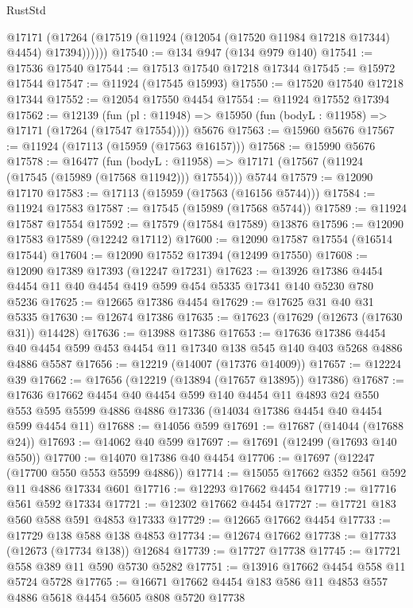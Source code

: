 \begin{lexlean}{RustStd}
\begin{coremodule}
        @17171 (@17264 (@17519 (@11924 (@12054 (@17520 @11984 @17218 @17344) @4454) @17394))))))
@17540 := @134 @947 (@134 @979 @140)
@17541 := @17536 @17540
@17544 := @17513 @17540 @17218 @17344
@17545 := @15972 @17544
@17547 := @11924 (@17545 @15993)
@17550 := @17520 @17540 @17218 @17344
@17552 := @12054 @17550 @4454
@17554 := @11924 @17552 @17394
@17562 := @12139
    (fun (pl : @11948) => @15950 (fun (bodyL : @11958) => @17171 (@17264 (@17547 @17554))))
    @5676
@17563 := @15960 @5676
@17567 := @11924 (@17113 (@15959 (@17563 @16157)))
@17568 := @15990 @5676
@17578 := @16477
    (fun (bodyL : @11958) => @17171 (@17567 (@11924 (@17545 (@15989 (@17568 @11942))) @17554)))
    @5744
@17579 := @12090 @17170
@17583 := @17113 (@15959 (@17563 (@16156 @5744)))
@17584 := @11924 @17583
@17587 := @17545 (@15989 (@17568 @5744))
@17589 := @11924 @17587 @17554
@17592 := @17579 (@17584 @17589) @13876
@17596 := @12090 @17583 @17589 (@12242 @17112)
@17600 := @12090 @17587 @17554 (@16514 @17544)
@17604 := @12090 @17552 @17394 (@12499 @17550)
@17608 := @12090 @17389 @17393 (@12247 @17231)
@17623 := @13926 @17386 @4454 @4454 @11 @40 @4454 @419 @599 @454 @5335 @17341 @140 @5230 @780 @5236
@17625 := @12665 @17386 @4454
@17629 := @17625 @31 @40 @31 @5335
@17630 := @12674 @17386
@17635 := @17623 (@17629 (@12673 (@17630 @31)) @14428)
@17636 := @13988 @17386
@17653 := @17636
    @17386
    @4454
    @40
    @4454
    @599
    @453
    @4454
    @11
    @17340
    @138
    @545
    @140
    @403
    @5268
    @4886
    @4886
    @5587
@17656 := @12219 (@14007 (@17376 @14009))
@17657 := @12224 @39
@17662 := @17656 (@12219 (@13894 (@17657 @13895)) @17386)
@17687 := @17636
    @17662
    @4454
    @40
    @4454
    @599
    @140
    @4454
    @11
    @4893
    @24
    @550
    @553
    @595
    @5599
    @4886
    @4886
    @17336
    (@14034 @17386 @4454 @40 @4454 @599 @4454 @11)
@17688 := @14056 @599
@17691 := @17687 (@14044 (@17688 @24))
@17693 := @14062 @40 @599
@17697 := @17691 (@12499 (@17693 @140 @550))
@17700 := @14070 @17386 @40 @4454
@17706 := @17697 (@12247 (@17700 @550 @553 @5599 @4886))
@17714 := @15055 @17662 @352 @561 @592 @11 @4886 @17334 @601
@17716 := @12293 @17662 @4454
@17719 := @17716 @561 @592 @17334
@17721 := @12302 @17662 @4454
@17727 := @17721 @183 @560 @588 @591 @4853 @17333
@17729 := @12665 @17662 @4454
@17733 := @17729 @138 @588 @138 @4853
@17734 := @12674 @17662
@17738 := @17733 (@12673 (@17734 @138)) @12684
@17739 := @17727 @17738
@17745 := @17721 @558 @389 @11 @590 @5730 @5282
@17751 := @13916 @17662 @4454 @558 @11 @5724 @5728
@17765 := @16671 @17662 @4454 @183 @586 @11 @4853 @557 @4886 @5618 @4454 @5605 @808 @5720 @17738

\end{coremodule}
\end{lexlean}

